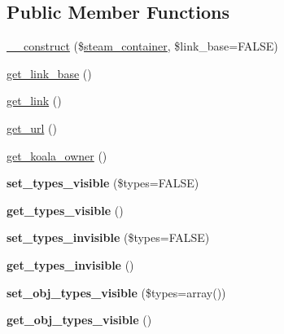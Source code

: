 \subsection*{Public Member Functions}
\begin{DoxyCompactItemize}
\item 
\hyperlink{classkoala__container_a772d706d36fe12e2f69bc31dde1ea8e7}{\_\-\_\-construct} (\$\hyperlink{classsteam__container}{steam\_\-container}, \$link\_\-base=FALSE)
\item 
\hyperlink{classkoala__container_a445f01d4e28c274735d38beac5c0f1e1}{get\_\-link\_\-base} ()
\item 
\hyperlink{classkoala__container_a4641893c4fc854ae033a888d68694601}{get\_\-link} ()
\item 
\hyperlink{classkoala__container_ae606ae88749a30baa3e1b42cece2c415}{get\_\-url} ()
\item 
\hyperlink{classkoala__container_af5ff29149c2de0b2b4c95205b29bdd44}{get\_\-koala\_\-owner} ()
\item 
\hypertarget{classkoala__container_aa7478a02bab9b3c6ca625ab5d8d7926b}{
{\bfseries set\_\-types\_\-visible} (\$types=FALSE)}
\label{classkoala__container_aa7478a02bab9b3c6ca625ab5d8d7926b}

\item 
\hypertarget{classkoala__container_a7fb496113627afa72ef8bd5976c6e64a}{
{\bfseries get\_\-types\_\-visible} ()}
\label{classkoala__container_a7fb496113627afa72ef8bd5976c6e64a}

\item 
\hypertarget{classkoala__container_a8cbc13746a263de85592809a92aac243}{
{\bfseries set\_\-types\_\-invisible} (\$types=FALSE)}
\label{classkoala__container_a8cbc13746a263de85592809a92aac243}

\item 
\hypertarget{classkoala__container_a4d946f81ce45f34f9635ec9337846d6f}{
{\bfseries get\_\-types\_\-invisible} ()}
\label{classkoala__container_a4d946f81ce45f34f9635ec9337846d6f}

\item 
\hypertarget{classkoala__container_a9fd958faca135a9c3579c56992c3e745}{
{\bfseries set\_\-obj\_\-types\_\-visible} (\$types=array())}
\label{classkoala__container_a9fd958faca135a9c3579c56992c3e745}

\item 
\hypertarget{classkoala__container_a27ff0ea8188dcfacd09ac7b52d1eac9a}{
{\bfseries get\_\-obj\_\-types\_\-visible} ()}
\label{classkoala__container_a27ff0ea8188dcfacd09ac7b52d1eac9a}


\end{DoxyCompactItemize}
